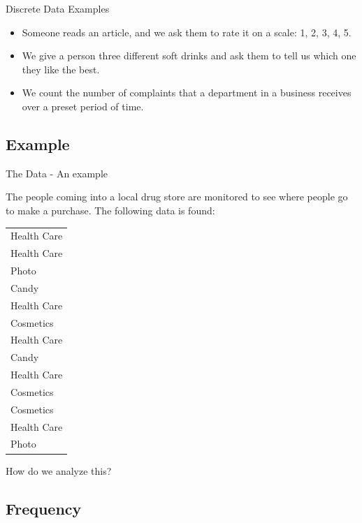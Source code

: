 \begin{frame}{Discrete Data Examples}

  \begin{itemize}
  \item Someone reads an article, and we ask them to rate it on a
    scale: 1, 2, 3, 4, 5.

  \item We give a person three different soft drinks and ask them to
    tell us which one they like the best.

  \item We count the number of complaints that a department in a
    business receives over a preset period of time.

  \end{itemize}
  
\end{frame}

\subsection{Example}

\begin{frame}{The Data - An example}

  The people coming into a local drug store are monitored to see where
  people go to make a purchase. The following data is found: \\
  \begin{tabular}{l}
    Health Care \\
    Health Care \\
    Photo \\
    Candy \\
    Health Care \\
    Cosmetics \\
    Health Care \\
    Candy \\
    Health Care \\
    Cosmetics \\
    Cosmetics \\
    Health Care \\
    Photo 
  \end{tabular}

  How do we analyze this?
  
\end{frame}


\subsection{Frequency}

